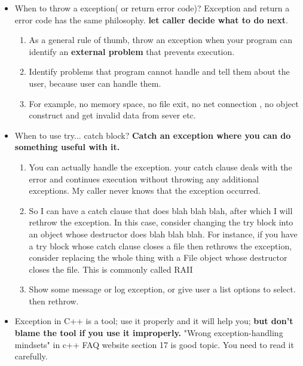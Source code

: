 \documentclass[a4paper,11pt,twoside]{book}
\begin{document}
\begin{itemize}
	\item When to throw a exception( or return error code)? Exception and return a error code has the same philosophy. \textbf{let caller decide what to do next}.

	\begin{enumerate}
		\item As a general rule of thumb, throw an exception when your program can identify an \textbf{external problem} that prevents execution.
		\item Identify problems that program cannot handle and tell them about the user, because user can handle them.
		\item For example, no memory space, no file exit, no net connection , no object construct and get invalid data from sever etc.
	\end{enumerate}
	
	\item When to use try... catch block? \textbf{Catch an exception where you can do something useful with it.}

	\begin{enumerate}
		\item You can actually handle the exception. your catch clause deals with the error and continues execution without throwing any additional exceptions. My caller never knows that the exception occurred.
		
		\item So I can have a catch clause that does blah blah blah, after which I will rethrow the exception. In this case, consider changing the try block into an object whose destructor does blah blah blah. For instance, if you have a try block whose catch clause closes a file then rethrows the exception, consider replacing the whole thing with a File object whose destructor closes the file. This is commonly called RAII
		
		\item Show some message or log exception, or give user a list options to select.  then rethrow.
	\end{enumerate}
		
	
	\item Exception in C++ is a tool; use it properly and it will help you; \textbf{but don't blame the tool if you use it improperly.} "Wrong exception-handling mindsets" in c++ FAQ website section 17 is good topic. You need to read it carefully.
	
\end{itemize}
\end{document}
